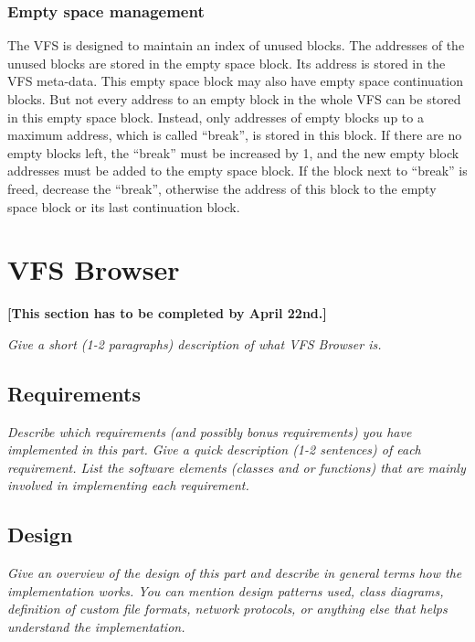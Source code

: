 \documentclass[a4paper,12pt]{article}
\begin{document}
\subsubsection{Empty space management}

The VFS is designed to maintain an index of unused blocks. The addresses of the unused blocks are stored in the empty space block. Its address is stored in the VFS meta-data. This empty space block may also have empty space continuation blocks. But not every address to an empty block in the whole VFS can be stored in this empty space block. Instead, only addresses of empty blocks up to a maximum address, which is called “break”, is stored in this block. If there are no empty blocks left, the “break” must be increased by 1, and the new empty block addresses must be added to the empty space block. If the block next to “break” is freed, decrease the “break”, otherwise the address of this block to the empty space block or its last continuation block.


\section{VFS Browser}

\textbf{[This section has to be completed by April 22nd.]}

\emph{Give a short (1-2 paragraphs) description of what VFS Browser is.}


\subsection{Requirements}

\emph{Describe which requirements (and possibly bonus requirements) you have implemented in this part. Give a quick description (1-2 sentences) of each requirement. List the software elements (classes and or functions) that are mainly involved in implementing each requirement.}


\subsection{Design}

\emph{Give an overview of the design of this part and describe in general terms how the implementation works. You can mention design patterns used, class diagrams, definition of custom file formats, network protocols, or anything else that helps understand the implementation.}
\end{document}
